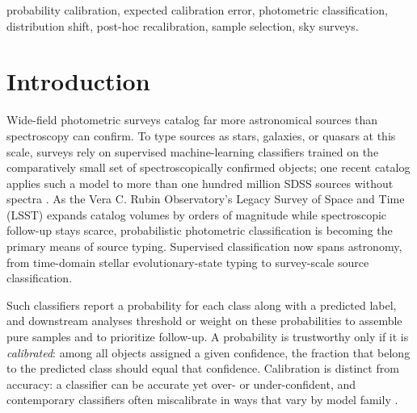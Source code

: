 \documentclass[conference]{IEEEtran}
\begin{document}
\begin{IEEEkeywords}
probability calibration, expected calibration error, photometric classification, distribution shift, post-hoc recalibration, sample selection, sky surveys.
\end{IEEEkeywords}

\section{Introduction}
Wide-field photometric surveys catalog far more astronomical sources than spectroscopy can confirm. To type sources as stars, galaxies, or quasars at this scale, surveys rely on supervised machine-learning classifiers trained on the comparatively small set of spectroscopically confirmed objects; one recent catalog applies such a model to more than one hundred million SDSS sources without spectra \cite{r10}. As the Vera C. Rubin Observatory's Legacy Survey of Space and Time (LSST) expands catalog volumes by orders of magnitude while spectroscopic follow-up stays scarce, probabilistic photometric classification is becoming the primary means of source typing. Supervised classification now spans astronomy, from time-domain stellar evolutionary-state typing \cite{r8} to survey-scale source classification.

Such classifiers report a probability for each class along with a predicted label, and downstream analyses threshold or weight on these probabilities to assemble pure samples and to prioritize follow-up. A probability is trustworthy only if it is \emph{calibrated}: among all objects assigned a given confidence, the fraction that belong to the predicted class should equal that confidence. Calibration is distinct from accuracy: a classifier can be accurate yet over- or under-confident, and contemporary classifiers often miscalibrate in ways that vary by model family \cite{r1,r2}.
\end{document}
